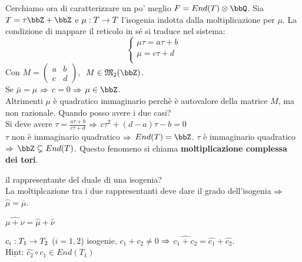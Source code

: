 \noindent Cerchiamo ora di caratterizzare un po' meglio $F=End(T) \otimes \bbQ$. Sia $T=\tau \bbZ + \bbZ$ e $\mu : T \rightarrow T$ l'isogenia indotta dalla moltiplicazione per $\mu$. La condizione di mappare il reticolo in sé si traduce nel sistema:
\begin{equation*}
\begin{cases}
	\mu \tau = a\tau + b\\
	\mu = c\tau + d\\
\end{cases}
\end{equation*}
Con $M=
\begin{pmatrix}
a & b \\
c & d
\end{pmatrix}$, $ \ M\in \mathfrak{M}_{2}(\bbZ)$.\\
Se $\bar{\mu}=\mu$ $\Rightarrow$ $c=0$ $\Rightarrow$ $\mu \in \bbZ$.\\
Altrimenti $\mu$ è quadratico immaginario perchè è autovalore della matrice $M$, ma non razionale.
Quando posso avere i due casi?\\
Si deve avere $\tau = \frac{a\tau + b}{c\tau + d}$ $\Rightarrow$ $c\tau^{2} + (d-a)\tau - b=0$\\
$\tau$ non è immaginario quadratico $\Rightarrow$ $End(T)=\bbZ$.
$\tau$ è immaginario quadratico $\Rightarrow$ $\bbZ \subsetneq End(T)$. Questo fenomeno si chiama {\bf moltiplicazione complessa dei tori}.

 il rappresentante del duale di una isogenia?\\
La moltiplcazione tra i due rappresentanti deve dare il grado dell'isogenia $\Rightarrow$ $\hat{\mu} = \overline{\mu}$. 
\begin{corollario}
$\hat{\mu + \nu} =\hat{\mu} + \hat{\nu}$
\end{corollario}

 $c_{i}: T_{1} \rightarrow T_{2}$ ($i=1 , 2$) isogenie, $c_{1}+c_{2} \neq 0$ $\Rightarrow$ $\hat{c_{1} + c_{2}}=\hat{c_{1}}+\hat{c_{2}}$.\\
{\bf $\underline{\mbox{Hint:}}$} $\hat{c_{2}}\circ c_{1} \in End(T_{1})$

